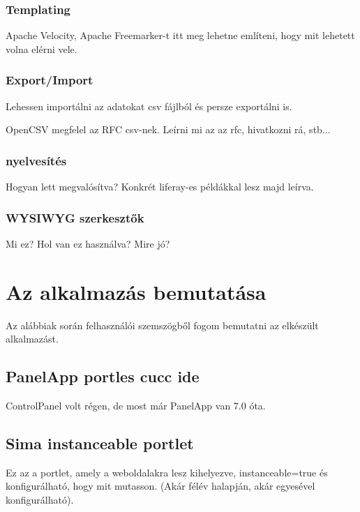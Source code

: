 \documentclass[hidelinks, 12pt, a4paper]{report}
\begin{document}
\subsection{Templating}

Apache Velocity, Apache Freemarker-t itt meg lehetne említeni, hogy mit lehetett volna elérni vele.

\subsection{Export/Import}

Lehessen importálni az adatokat csv fájlból és persze exportálni is.

OpenCSV megfelel az RFC csv-nek. Leírni mi az az rfc, hivatkozni rá, stb...

\subsection{nyelvesítés}

Hogyan lett megvalósítva? Konkrét liferay-es példákkal lesz majd leírva.

\subsection{WYSIWYG szerkesztők}

Mi ez? Hol van ez használva? Mire jó?

\chapter{Az alkalmazás bemutatása}

Az alábbiak során felhasználói szemszögből fogom bemutatni az elkészült alkalmazást.

\section{PanelApp portles cucc ide}

ControlPanel volt régen, de most már PanelApp van 7.0 óta.

\section{Sima instanceable portlet}

Ez az a portlet, amely a weboldalakra lesz kihelyezve, instanceable=true és konfigurálható, hogy mit mutasson. (Akár félév halapján, akár egyesével konfigurálható).
\end{document}

